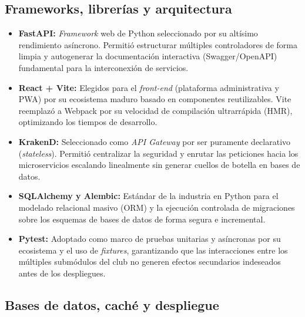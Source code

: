 \subsection{Frameworks, librerías y arquitectura}

\begin{itemize}
    \item \textbf{FastAPI:} \textit{Framework} web de Python seleccionado por su altísimo rendimiento asíncrono. Permitió estructurar múltiples controladores de forma limpia y autogenerar la documentación interactiva (Swagger/OpenAPI) fundamental para la interconexión de servicios.
    \item \textbf{React + Vite:} Elegidos para el \textit{front-end} (plataforma administrativa y PWA) por su ecosistema maduro basado en componentes reutilizables. Vite reemplazó a Webpack por su velocidad de compilación ultrarrápida (HMR), optimizando los tiempos de desarrollo.
    \item \textbf{KrakenD:} Seleccionado como \textit{API Gateway} por ser puramente declarativo (\textit{stateless}). Permitió centralizar la seguridad y enrutar las peticiones hacia los microservicios escalando linealmente sin generar cuellos de botella en bases de datos.
    \item \textbf{SQLAlchemy y Alembic:} Estándar de la industria en Python para el modelado relacional masivo (ORM) y la ejecución controlada de migraciones sobre los esquemas de bases de datos de forma segura e incremental.
    \item \textbf{Pytest:} Adoptado como marco de pruebas unitarias y asíncronas por su ecosistema y el uso de \textit{fixtures}, garantizando que las interacciones entre los múltiples submódulos del club no generen efectos secundarios indeseados antes de los despliegues.
\end{itemize}

\subsection{Bases de datos, caché y despliegue}

